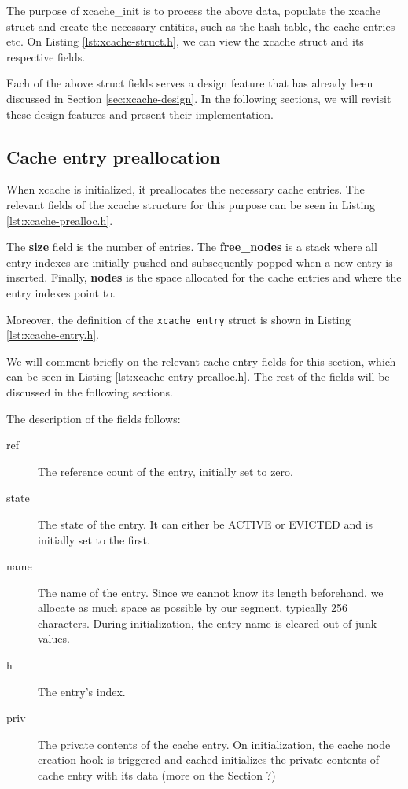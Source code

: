 The purpose of xcache\_init is to process the above data, populate the xcache 
struct and create the necessary entities, such as the hash table, the cache 
entries etc. On Listing \ref{lst:xcache-struct.h}, we can view the xcache 
struct and its respective fields.


Each of the above \xcache struct fields serves a design feature that has 
already been discussed in Section \ref{sec:xcache-design}. In the following 
sections, we will revisit these design features and present their 
implementation.

\subsection{Cache entry preallocation}

When xcache is initialized, it preallocates the necessary cache entries. The 
relevant fields of the xcache structure for this purpose can be seen in Listing 
\ref{lst:xcache-prealloc.h}.


The \textbf{size} field is the number of entries. The \textbf{free\_nodes} is a 
stack where all entry indexes are initially pushed and subsequently popped when 
a new entry is inserted. Finally, \textbf{nodes} is the space allocated for the 
cache entries and where the entry indexes point to.

Moreover, the definition of the \texttt{xcache entry} struct is shown in 
Listing \ref{lst:xcache-entry.h}.


We will comment briefly on the relevant cache entry fields for this section, 
which can be seen in Listing \ref{lst:xcache-entry-prealloc.h}. The rest of the 
fields will be discussed in the following sections.


The description of the fields follows:

\begin{description}
	\item[ref] The reference count of the entry, initially set to zero.
	\item[state] The state of the entry. It can either be ACTIVE or EVICTED and 
		is initially set to the first.
	\item[name] The name of the entry. Since we cannot know its length 
		beforehand, we allocate as much space as possible by our segment, 
		typically 256 characters. During initialization, the entry name is 
		cleared out of junk values.
	\item[h] The entry's index.
	\item[priv] The private contents of the cache entry. On initialization, the 
		cache node creation hook is triggered and cached initializes the 
		private contents of cache entry with its data (more on the Section ?)
\end{description}

